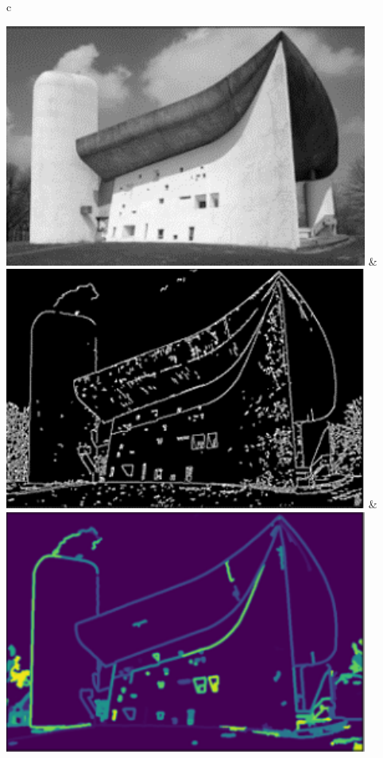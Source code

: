 \documentclass[final,5p,times]{elsarticle}
\begin{document}
\begin{table}[!htb]
\begin{tabular}{c}
\begin{minipage}{\textwidth}
\begin{tabularx}
                    {\includegraphics[width=1\linewidth]{Images/CICAHistory2}} &
                  {\includegraphics[width=1\linewidth]{Images/CICAHistory3}} &
                  {\includegraphics[width=1\linewidth]{Images/CICAHistory4}}\\

\end{tabularx}
\end{minipage}
\end{tabular}
\end{table}
\end{document}
